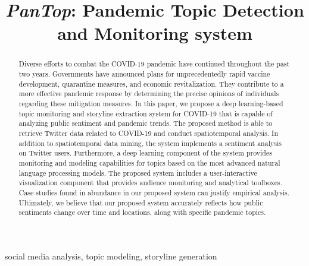\documentclass[conference]{IEEEtran}
\begin{document}
\title{{\it PanTop}: Pandemic Topic Detection and Monitoring system}

\author{
}

\maketitle

\begin{abstract} 
Diverse efforts to combat the COVID-19 pandemic have continued throughout the
past two years. Governments have announced plans for unprecedentedly rapid
vaccine development, quarantine measures, and economic revitalization. They
contribute to a more effective pandemic response by determining the precise
opinions of individuals regarding these mitigation measures. In this paper,
we propose a deep learning-based topic monitoring and storyline extraction
system for COVID-19 that is capable of analyzing public sentiment and
pandemic trends. The proposed method is able to retrieve Twitter data related
to COVID-19 and conduct spatiotemporal analysis. In addition to
spatiotemporal data mining, the system implements a sentiment analysis on
Twitter users. Furthermore, a deep learning component of the system provides
monitoring and modeling capabilities for topics based on the most advanced
natural language processing models. The proposed system includes a
user-interactive visualization component that provides audience monitoring
and analytical toolboxes. Case studies found in abundance in our proposed
system can justify empirical analysis. Ultimately, we believe that our
proposed system accurately reflects how public sentiments change over time
and locations, along with specific pandemic topics. 
\end{abstract}

\begin{IEEEkeywords}
social media analysis, topic modeling, storyline generation
\end{IEEEkeywords}


% 







\end{document}
